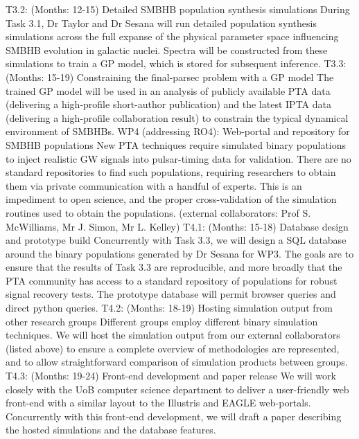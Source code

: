 \documentclass[11pt,letterpaper,sans]{moderncv} %
\begin{document}
	T3.2: (Months: 12-15) Detailed SMBHB population synthesis simulations
During Task 3.1, Dr Taylor and Dr Sesana will run detailed population synthesis simulations across the full expanse of the physical parameter space influencing SMBHB evolution in galactic nuclei. Spectra will be constructed from these simulations to train a GP model, which is stored for subsequent inference.
	T3.3: (Months: 15-19) Constraining the final-parsec problem with a GP model
The trained GP model will be used in an analysis of publicly available PTA data (delivering a high-profile short-author publication) and the latest IPTA data (delivering a high-profile collaboration result) to constrain the typical dynamical environment of SMBHBs. 
WP4 (addressing RO4): Web-portal and repository for SMBHB populations
New PTA techniques require simulated binary populations to inject realistic GW signals into pulsar-timing data for validation. There are no standard repositories to find such populations, requiring researchers to obtain them via private communication with a handful of experts. This is an impediment to open science, and the proper cross-validation of the simulation routines used to obtain the populations.
(external collaborators: Prof S. McWilliams, Mr J. Simon, Mr L. Kelley)
	T4.1: (Months: 15-18) Database design and prototype build
	Concurrently with Task 3.3, we will design a SQL database around the binary populations generated by Dr Sesana for WP3. The goals are to ensure that the results of Task 3.3 are reproducible, and more broadly that the PTA community has access to a standard repository of populations for robust signal recovery tests. The prototype database will permit browser queries and direct python queries.
	T4.2: (Months: 18-19) Hosting simulation output from other research groups
Different groups employ different binary simulation techniques. We will host the simulation output from our external collaborators (listed above) to ensure a complete overview of methodologies are represented, and to allow straightforward comparison of simulation products between groups.
	T4.3: (Months: 19-24) Front-end development and paper release
We will work closely with the UoB computer science department to deliver a user-friendly web front-end with a similar layout to the Illustris and EAGLE web-portals. Concurrently with this front-end development, we will draft a paper describing the hosted simulations and the database features. 
\end{document}
